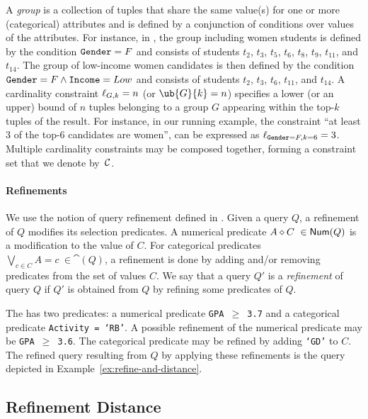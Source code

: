 A {\it group} is a collection of tuples that share the same value(s) for one or more (categorical) attributes and is defined by a conjunction of conditions over values of the attributes. For instance, in , the group including women students 
is defined by the condition ${\tt Gender} = F$ and consists of students $t_2$, $t_3$, $t_5$, $t_6$, $t_8$,  $t_9$,  $t_{11}$, and $t_{14}$. The group of low-income women candidates is then defined by the condition ${\tt Gender} = F \wedge {\tt Income} = Low$ and consists of students $t_2$, $t_3$, $t_6$, $t_{11}$, and $t_{14}$. A cardinality constraint $\ell_{G, k} = n$ (or $\ub{G}{k} = n$) specifies a lower (or an upper) bound of $n$ tuples belonging to a group $G$ appearing within the top-$k$ tuples of the result. For instance, in our running example, the constraint ``at least $3$ of the top-$6$ candidates are women'', can be expressed as  $\ell_{{\tt Gender} = F, k=6} = 3$. Multiple cardinality constraints may be composed together, forming a constraint set that we denote by~$\mathcal{C}{}$.

\paragraph*{\textbf{Refinements}} We use the notion of query refinement defined in \cite{MK09}. Given a query $Q$, a refinement of $Q$ modifies its selection predicates. A numerical predicate $A \diamond C~\in \textsf{Num}(Q)$ is a modification to the value of $C$. For categorical predicates $\bigvee_{c \in C} A = c~ \in \cat(Q)$, a refinement is done by adding and/or removing predicates from the set of values $C$.  We say that a query $Q'$ is a \emph{refinement} of query $Q$ if $Q'$ is obtained from $Q$ by refining some predicates of $Q$.

\begin{example}
    The \running{} has two predicates: a numerical predicate {\tt GPA $\geq$ 3.7} and a categorical predicate {\tt Activity = `RB'}. A possible refinement of the numerical predicate may be {\tt GPA $\geq$ 3.6}. The categorical predicate may be refined by adding {\tt `GD'} to $C$. The refined query resulting from $Q$ by applying these refinements is the query depicted in Example~\ref{ex:refine-and-distance}. 
\end{example}

\subsection{Refinement Distance}
\label{sec:distance}

